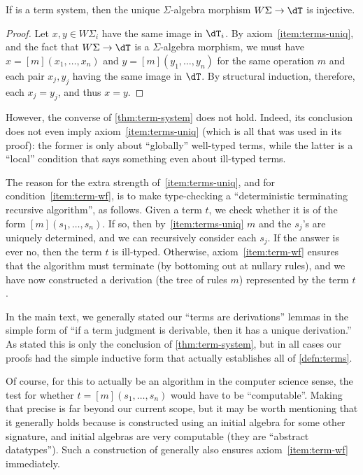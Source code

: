 \documentclass{book}
\def\sig{\Sigma}
\def\act#1{[#1]}
\begin{document}
\begin{lem}\label{thm:term-system}
  If \dT is a term system, then the unique $\sig$-algebra morphism $W\sig \to \dT$ is injective.
\end{lem}
\begin{proof}
  Let $x,y\in W\sig_i$ have the same image in $\dT_i$.
  By axiom~\ref{item:terms-uniq}, and the fact that $W\sig \to \dT$ is a $\sig$-algebra morphism, we must have $x=\act m(x_1,\dots,x_n)$ and $y=\act m(y_1,\dots,y_n)$ for the same operation $m$ and each pair $x_j,y_j$ having the same image in $\dT$.
  By structural induction, therefore, each $x_j=y_j$, and thus $x=y$.
\end{proof}

However, the converse of \cref{thm:term-system} does not hold.
Indeed, its conclusion does not even imply axiom~\ref{item:terms-uniq} (which is all that was used in its proof): the former is only about ``globally'' well-typed terms, while the latter is a ``local'' condition that says something even about ill-typed terms.

The reason for the extra strength of~\ref{item:terms-uniq}, and for condition~\ref{item:term-wf}, is to make type-checking a ``deterministic terminating recursive algorithm'', as follows.
Given a term $t$, we check whether it is of the form $\act m(s_1,\dots,s_n)$.
If so, then by~\ref{item:terms-uniq} $m$ and the $s_j$'s are uniquely determined, and we can recursively consider each $s_j$.
If the answer is ever no, then the term $t$ is ill-typed.
Otherwise, axiom~\ref{item:term-wf} ensures that the algorithm must terminate (by bottoming out at nullary rules), and we have now constructed a derivation (the tree of rules $m$) represented by the term $t$.

In the main text, we generally stated our ``terms are derivations'' lemmas in the simple form of ``if a term judgment is derivable, then it has a unique derivation.''
As stated this is only the conclusion of \cref{thm:term-system}, but in all cases our proofs had the simple inductive form that actually establishes all of \cref{defn:terms}.

Of course, for this to actually be an algorithm in the computer science sense, the test for whether $t=\act m(s_1,\dots,s_n)$ would have to be ``computable''.
Making that precise is far beyond our current scope, but it may be worth mentioning that it generally holds because \dT is constructed using an initial algebra for some other signature, and initial algebras are very computable (they are ``abstract datatypes'').
Such a construction of \dT generally also ensures axiom~\ref{item:term-wf} immediately.
\end{document}
